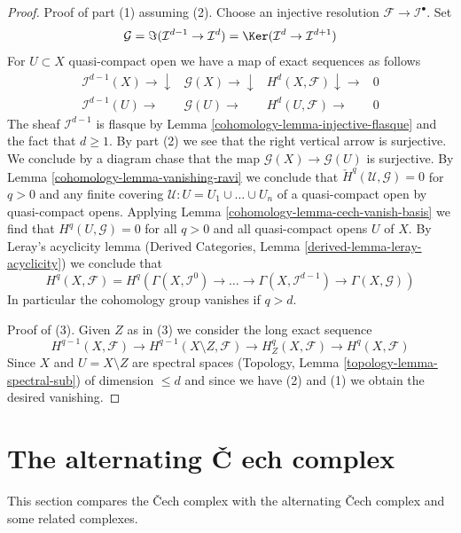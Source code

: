 \begin{proof}
\medskip\noindent
Proof of part (1) assuming (2). Choose an injective resolution
$\mathcal{F} \to \mathcal{I}^\bullet$. Set
$$
\mathcal{G} = \Im(\mathcal{I}^{d - 1} \to \mathcal{I}^d) =
\Ker(\mathcal{I}^d \to \mathcal{I}^{d + 1})
$$
For $U \subset X$ quasi-compact open we have a map of exact sequences
as follows
$$
\begin{array}{cccc}\mathcal{I}^{d - 1}(X) \longrightarrow\downarrow & \mathcal{G}(X) \longrightarrow\downarrow & H^d(X, \mathcal{F}) \downarrow\longrightarrow & 0 \\ \mathcal{I}^{d - 1}(U) \longrightarrow & \mathcal{G}(U) \longrightarrow & H^d(U, \mathcal{F}) \longrightarrow & 0\end{array}
$$
The sheaf $\mathcal{I}^{d - 1}$ is flasque by
Lemma \ref{cohomology-lemma-injective-flasque} and the fact that $d \geq 1$.
By part (2) we see that the right vertical arrow is surjective.
We conclude by a diagram chase that the map
$\mathcal{G}(X) \to \mathcal{G}(U)$ is surjective.
By Lemma \ref{cohomology-lemma-vanishing-ravi} we conclude that
$\check{H}^q(\mathcal{U}, \mathcal{G}) = 0$ for $q > 0$ and
any finite covering $\mathcal{U} : U = U_1 \cup \ldots \cup U_n$
of a quasi-compact open by quasi-compact opens. Applying
Lemma \ref{cohomology-lemma-cech-vanish-basis} we find that $H^q(U, \mathcal{G}) = 0$
for all $q > 0$ and all quasi-compact opens $U$ of $X$.
By Leray's acyclicity lemma
(Derived Categories, Lemma \ref{derived-lemma-leray-acyclicity})
we conclude that
$$
H^q(X, \mathcal{F}) =
H^q\left(
\Gamma(X, \mathcal{I}^0) \to \ldots \to
\Gamma(X, \mathcal{I}^{d - 1}) \to \Gamma(X, \mathcal{G})
\right)
$$
In particular the cohomology group vanishes if $q > d$.

\medskip\noindent
Proof of (3).  Given $Z$ as in (3) we consider the long exact sequence
$$
H^{q - 1}(X, \mathcal{F}) \to
H^{q - 1}(X \setminus Z, \mathcal{F}) \to
H^q_Z(X, \mathcal{F}) \to H^q(X, \mathcal{F})
$$
Since $X$ and $U = X \setminus Z$ are spectral spaces
(Topology, Lemma \ref{topology-lemma-spectral-sub})
of dimension $\leq d$
and since we have (2) and (1) we obtain the desired vanishing.
\end{proof}

\section{The alternating {\v C}
ech complex}
\label{cohomology-section-alternating-cech}

This section compares the {\v C}ech complex with the alternating {\v C}ech
complex and some related complexes.

